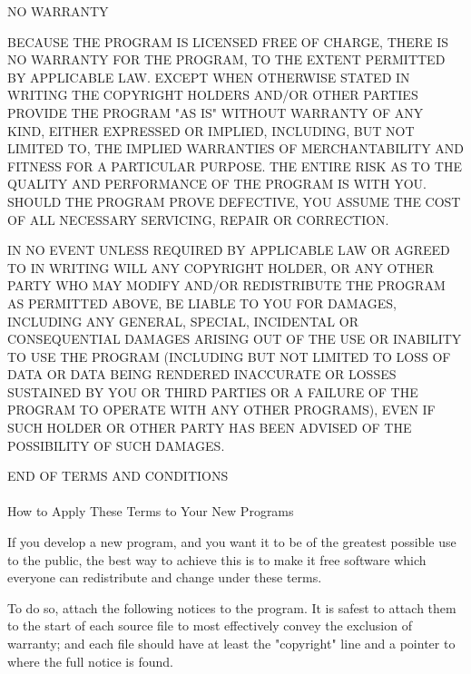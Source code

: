 {\begin{description}
\begin{center}
			    NO WARRANTY
\end{center}

\item[11.\hphantom{X}] BECAUSE THE PROGRAM IS LICENSED FREE OF CHARGE,
THERE IS NO WARRANTY FOR THE PROGRAM, TO THE EXTENT PERMITTED BY
APPLICABLE \hbox{LAW}.  EXCEPT WHEN OTHERWISE STATED IN WRITING THE
COPYRIGHT HOLDERS AND/OR OTHER PARTIES PROVIDE THE PROGRAM "AS IS"
WITHOUT WARRANTY OF ANY KIND, EITHER EXPRESSED OR IMPLIED, INCLUDING,
BUT NOT LIMITED TO, THE IMPLIED WARRANTIES OF MERCHANTABILITY AND
FITNESS FOR A PARTICULAR \hbox{PURPOSE}.  THE ENTIRE RISK AS TO THE
QUALITY AND PERFORMANCE OF THE PROGRAM IS WITH \hbox{YOU}.  SHOULD THE
PROGRAM PROVE DEFECTIVE, YOU ASSUME THE COST OF ALL NECESSARY
SERVICING, REPAIR OR \hbox{CORRECTION}.

\item[12.\hphantom{X}] IN NO EVENT UNLESS REQUIRED BY APPLICABLE LAW
OR AGREED TO IN WRITING WILL ANY COPYRIGHT HOLDER, OR ANY OTHER PARTY
WHO MAY MODIFY AND/OR REDISTRIBUTE THE PROGRAM AS PERMITTED ABOVE, BE
LIABLE TO YOU FOR DAMAGES, INCLUDING ANY GENERAL, SPECIAL, INCIDENTAL
OR CONSEQUENTIAL DAMAGES ARISING OUT OF THE USE OR INABILITY TO USE
THE PROGRAM (INCLUDING BUT NOT LIMITED TO LOSS OF DATA OR DATA BEING
RENDERED INACCURATE OR LOSSES SUSTAINED BY YOU OR THIRD PARTIES OR A
FAILURE OF THE PROGRAM TO OPERATE WITH ANY OTHER PROGRAMS), EVEN IF
SUCH HOLDER OR OTHER PARTY HAS BEEN ADVISED OF THE POSSIBILITY OF SUCH
\hbox{DAMAGES}.
\end{description}

\begin{center}
		     END OF TERMS AND CONDITIONS \\
                              {\ } \\
	    How to Apply These Terms to Your New Programs \\
\end{center}

  If you develop a new program, and you want it to be of the greatest
possible use to the public, the best way to achieve this is to make it
free software which everyone can redistribute and change under these
terms.

  To do so, attach the following notices to the program.  It is safest
to attach them to the start of each source file to most effectively
convey the exclusion of warranty; and each file should have at least
the "copyright" line and a pointer to where the full notice is found.

}
